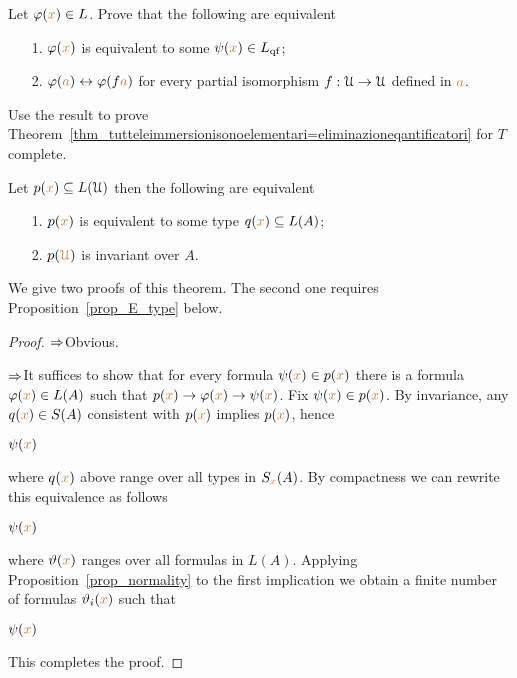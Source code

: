 \documentclass[creche.tex]{subfiles}
\begin{document}
\begin{exercise}
Let $\varphi({\color{brown} x})\in L$. Prove that the following are equivalent
\begin{itemize}
 \item[1.] $\varphi({\color{brown} x})$ is equivalent to some $\psi({\color{brown} x})\in L_{\rm qf}$;
 \item[2.] $\varphi({\color{brown} a})\leftrightarrow \varphi(f{\color{brown} a})$ for every partial isomorphism $f:\EuScript U\to\EuScript U$ defined in ${\color{brown} a}$.
\end{itemize}
Use the result to prove Theorem~\ref{thm_tutteleimmersionisonoelementari=eliminazioneqantificatori} for $T$ complete.\QED
\end{exercise}


\begin{proposition}\label{prop_inv_types}
Let $p({\color{brown} x})\subseteq L(\EuScript U)$ then the following are equivalent
\begin{itemize}
 \item[1.] $p({\color{brown} x})$ is equivalent to some type $q({\color{brown} x})\subseteq L(A)$;
 \item[2.] $p({\color{brown}\EuScript U})$ is invariant over $A$.
\end{itemize}
\end{proposition}

We give two proofs of this theorem.  The second one requires Proposition~\ref{prop_E_type} below.

\begin{proof}
$\Rightarrow$\quad Obvious. 

$\Rightarrow$\quad It suffices to show that for every formula $\psi({\color{brown} x})\in p({\color{brown} x})$ there is a formula $\varphi({\color{brown} x})\in L(A)$ such that $p({\color{brown} x})\rightarrow\varphi({\color{brown} x})\rightarrow\psi({\color{brown} x})$. Fix $\psi({\color{brown} x})\in p({\color{brown} x})$. By invariance, any $q({\color{brown} x})\in S(A)$ consistent with $p({\color{brown} x})$ implies $p({\color{brown} x})$, hence

\medrel{\imp}$\psi({\color{brown} x})$

where $q({\color{brown} x})$ above range over all types in $S_{\color{brown} x}(A)$. By compactness we can rewrite this equivalence as follows

\medrel{\imp}$\psi({\color{brown} x})$

where $\vartheta({\color{brown} x})$ ranges over all formulas in $L(A)$. Applying Proposition~\ref{prop_normality} to the first implication we obtain a finite number of formulas $\vartheta_i({\color{brown} x})$ such that 

\medrel{\imp}$\psi({\color{brown} x})$

This completes the proof.
\end{proof}
\end{document}
